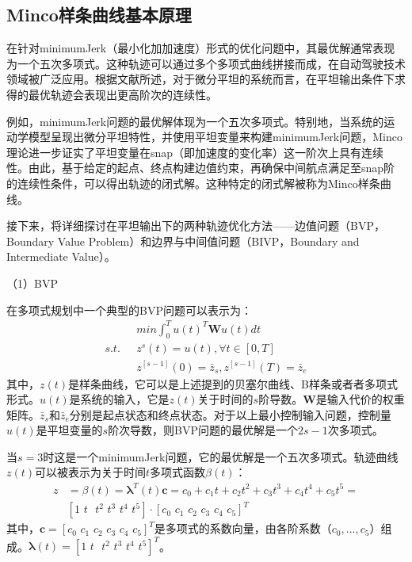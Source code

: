 \documentclass[master,academic]{ysuthesis} %
\begin{document}
		\subsection{Minco样条曲线基本原理}
		在针对minimumJerk（最小化加加速度）形式的优化问题中，其最优解通常表现为一个五次多项式。这种轨迹可以通过多个多项式曲线拼接而成，在自动驾驶技术领域被广泛应用。根据文献\cite{wang2022geometrically}所述，对于微分平坦的系统而言，在平坦输出条件下求得的最优轨迹会表现出更高阶次的连续性。
		
		例如，minimumJerk问题的最优解体现为一个五次多项式。特别地，当系统的运动学模型呈现出微分平坦特性，并使用平坦变量来构建minimumJerk问题，Minco理论进一步证实了平坦变量在snap（即加速度的变化率）这一阶次上具有连续性。由此，基于给定的起点、终点构建边值约束，再确保中间航点满足至snap阶的连续性条件，可以得出轨迹的闭式解。这种特定的闭式解被称为Minco样条曲线。

		接下来，将详细探讨在平坦输出下的两种轨迹优化方法——边值问题（BVP，Boundary Value Problem）和边界与中间值问题（BIVP，Boundary and Intermediate Value）。

		（1）BVP

		在多项式规划中一个典型的BVP问题可以表示为：
		\begin{equation}
			\begin{aligned}
				&min\int_0^T{u}(t) ^T\bm{W}u(t) dt\\
				s.t. \ \ \ &z^s(t) =u(t) ,\forall t\in \left[ 0,T \right] \\
				&z^{\left[ s-1 \right]}(0) =\bar{z}_s,z^{\left[ s-1 \right]}(T) =\bar{z}_e
			\end{aligned}
		\end{equation}
		其中，$z(t)$是样条曲线，它可以是上述提到的贝塞尔曲线、B样条或者者多项式形式。$u(t)$是系统的输入，它是$z(t)$关于时间的$s$阶导数。$\bm{W}$是输入代价的权重矩阵。$\bar{z}_s$和$\bar{z}_e$分别是起点状态和终点状态。对于以上最小控制输入问题，控制量$u(t)$是平坦变量的$s$阶次导数，则BVP问题的最优解是一个$2s-1$次多项式。

		当$s=3$时这是一个minimumJerk问题，它的最优解是一个五次多项式。轨迹曲线$z(t)$可以被表示为关于时间$t$多项式函数$\beta(t)$：
		\begin{equation}
			\begin{aligned}
				z&=\beta (t) =\bm{\lambda} ^T(t) \bm{c} =c_0+c_1t+c_2t^2+c_3t^3+c_4t^4+c_5t^5=\\
				&\left[ 1\,\,t\,\,\,\,t^2\,\,t^3\,\,t^4\,\,t^5 \right] \cdot \left[ c_0\,\,c_1\,\,c_2\,\,c_3\,\,c_4\,\,c_5 \right] ^T
			\end{aligned}
		\end{equation}
		其中，$\bm{c}=\left[ c_0\,\,c_1\,\,c_2\,\,c_3\,\,c_4\,\,c_5 \right] ^T$是多项式的系数向量，由各阶系数（$c_0,...,c_5$）组成。$\bm{\lambda}(t)=\left[ 1\,\,t\,\,\,\,t^2\,\,t^3\,\,t^4\,\,t^5 \right]^T$。
		
\end{document}
